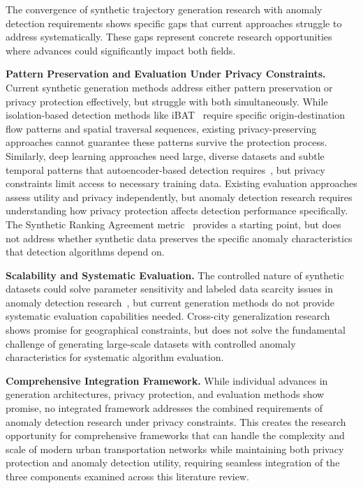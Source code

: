 \documentclass[runningheads]{llncs}
\begin{document}
The convergence of synthetic trajectory generation research with anomaly detection requirements shows specific gaps that current approaches struggle to address systematically. These gaps represent concrete research opportunities where advances could significantly impact both fields.

\textbf{Pattern Preservation and Evaluation Under Privacy Constraints.} Current synthetic generation methods address either pattern preservation or privacy protection effectively, but struggle with both simultaneously. While isolation-based detection methods like iBAT~\cite{zhang2019ibat} require specific origin-destination flow patterns and spatial traversal sequences, existing privacy-preserving approaches cannot guarantee these patterns survive the protection process. Similarly, deep learning approaches need large, diverse datasets and subtle temporal patterns that autoencoder-based detection requires~\cite{huang2021lstm}, but privacy constraints limit access to necessary training data. Existing evaluation approaches assess utility and privacy independently, but anomaly detection research requires understanding how privacy protection affects detection performance specifically. The Synthetic Ranking Agreement metric~\cite{jordon2019pate} provides a starting point, but does not address whether synthetic data preserves the specific anomaly characteristics that detection algorithms depend on.

\textbf{Scalability and Systematic Evaluation.} The controlled nature of synthetic datasets could solve parameter sensitivity and labeled data scarcity issues in anomaly detection research~\cite{zhang2019ibat}, but current generation methods do not provide systematic evaluation capabilities needed. Cross-city generalization research~\cite{wang2025gtg} shows promise for geographical constraints, but does not solve the fundamental challenge of generating large-scale datasets with controlled anomaly characteristics for systematic algorithm evaluation.

\textbf{Comprehensive Integration Framework.} While individual advances in generation architectures, privacy protection, and evaluation methods show promise, no integrated framework addresses the combined requirements of anomaly detection research under privacy constraints. This creates the research opportunity for comprehensive frameworks that can handle the complexity and scale of modern urban transportation networks while maintaining both privacy protection and anomaly detection utility, requiring seamless integration of the three components examined across this literature review.
\end{document}
